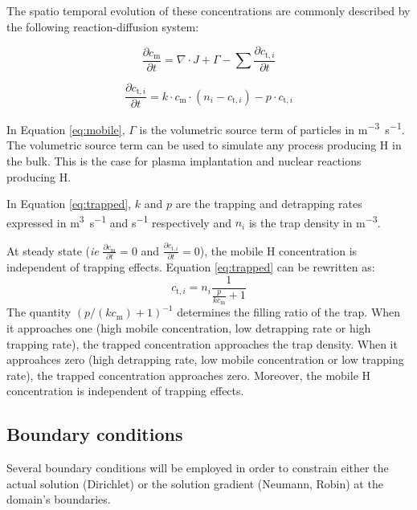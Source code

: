The spatio temporal evolution of these concentrations are commonly described by the following reaction-diffusion system:

\begin{equation}
    \frac{\partial c_\mathrm{m}}{\partial t}=\nabla \cdot J+\Gamma-\sum \frac{\partial c_{\mathrm{t}, i}}{\partial t}
    \label{eq:mobile}
\end{equation}

\begin{equation}
    \frac{\partial c_{\mathrm{t}, i}}{\partial t}=k \cdot c_\mathrm{m} \cdot\left(n_{i}-c_{\mathrm{t}, i}\right)-p \cdot c_{\mathrm{t}, i}
    \label{eq:trapped}
\end{equation}

In Equation \ref{eq:mobile}, $\Gamma$ is the volumetric source term of particles in \si{m^{-3}.s^{-1}}.
The volumetric source term can be used to simulate any process producing H in the bulk.
This is the case for plasma implantation and nuclear reactions producing H.

In Equation \ref{eq:trapped}, $k$ and $p$ are the trapping and detrapping rates expressed in \si{m^3.s^{-1}} and \si{s^{-1}} respectively and $n_i$ is the trap density in \si{m^{-3}}.

At steady state (\textit{ie} $\frac{\partial c_\mathrm{m}}{\partial t} = 0$ and $\frac{\partial c_{\mathrm{t}, i}}{\partial t} = 0$), the mobile H concentration is independent of trapping effects.
Equation \ref{eq:trapped} can be rewritten as:
\begin{equation}
    c_{\mathrm{t}, i} = n_i \frac{1}{\frac{p}{k c_\mathrm{m}} + 1}
    \label{eq: steady state ct}
\end{equation}
The quantity $(p / (k c_\mathrm{m}) + 1)^{-1}$ determines the filling ratio of the trap. 
When it approaches one (high mobile concentration, low detrapping rate or high trapping rate), the trapped concentration approaches the trap density.
When it approahces zero (high detrapping rate, low mobile concentration or low trapping rate), the trapped concentration approaches zero.
Moreover, the mobile H concentration is independent of trapping effects.

\subsection{Boundary conditions}

Several boundary conditions will be employed in order to constrain either the actual solution (Dirichlet) or the solution gradient (Neumann, Robin) at the domain's boundaries.

